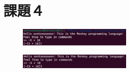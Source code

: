 \documentclass[fleqn, a4paper. 12pt]{ltjsarticle}
\begin{document}
  \section{課題４}
  \begin{figure}[htbp]
    \centering
    \includegraphics[width=0.5\textwidth]{images/4_before.png}
    \caption{}
    \label{fig:4_before}
  \end{figure}

  \begin{figure}[htbp]
    \centering
    \includegraphics[width=0.5\textwidth]{images/4_after.png}
    \caption{}
    \label{fig:4_after}
  \end{figure}
\end{document}
